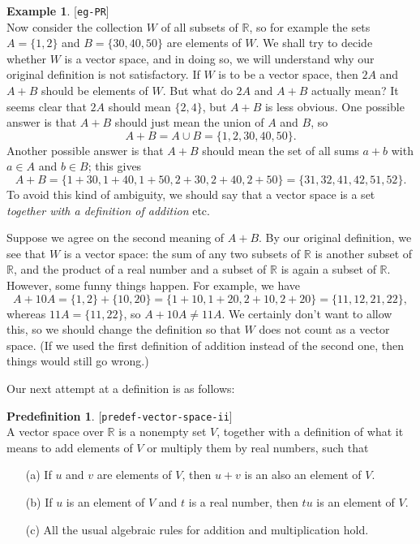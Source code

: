 \documentclass{amsart}
\newcommand{\lbl}[1]{\label{#1}\textup{[\texttt{#1}]}\ \\}
\newcommand{\lbl}{\label}
\newcommand{\R}         {{\mathbb{R}}}
\renewcommand{\:}       {\colon}
\theoremstyle{definition}
\newtheorem{predefinition}[theorem]{Predefinition}
\newtheorem{example}[theorem]{Example}
\begin{document}
\begin{example}\lbl{eg-PR}
 Now consider the collection $W$ of all subsets of $\R$, so
 for example the sets $A=\{1,2\}$ and $B=\{30,40,50\}$ are
 elements of $W$.  We shall try to decide whether $W$ is a
 vector space, and in doing so, we will understand why our
 original definition is not satisfactory.  If $W$ is to be a
 vector space, then $2A$ and $A+B$ should be elements of
 $W$.  But what do $2A$ and $A+B$ actually mean?  It seems
 clear that $2A$ should mean $\{2,4\}$, but $A+B$ is less
 obvious.  One possible answer is that $A+B$ should just
 mean the union of $A$ and $B$, so
 \[ A+B = A\cup B = \{1,2,30,40,50\}. \]
 Another possible answer is that $A+B$ should mean the set
 of all sums $a+b$ with $a\in A$ and $b\in B$; this gives
 \[ A+B = \{1+30,1+40,1+50,2+30,2+40,2+50\} =
          \{31,32,41,42,51,52\}.
 \]
 To avoid this kind of ambiguity, we should say that a
 vector space is a set \emph{together with a definition of
  addition} etc.

 Suppose we agree on the second meaning of $A+B$.  By our
 original definition, we see that $W$ is a vector space: the
 sum of any two subsets of $\R$ is another subset of $\R$,
 and the product of a real number and a subset of $\R$ is
 again a subset of $\R$.  However, some funny things happen.
 For example, we have
 \[ A+10 A = \{1,2\} + \{10,20\} =
      \{1+10,1+20,2+10,2+20\} = \{11,12,21,22\}, 
 \]
 whereas $11A=\{11,22\}$, so $A+10A\neq 11A$.  We certainly
 don't want to allow this, so we should change the
 definition so that $W$ does not count as a vector space.
 (If we used the first definition of addition instead of the
 second one, then things would still go wrong.)
\end{example}

Our next attempt at a definition is as follows:
\begin{predefinition}\lbl{predef-vector-space-ii}
 A vector space over $\R$ is a nonempty set $V$, together
 with a definition of what it means to add elements of $V$
 or multiply them by real numbers, such that
 \begin{itemize}
  \item[(a)] If $u$ and $v$ are elements of $V$, then $u+v$ is an
   also an element of $V$.
  \item[(b)] If $u$ is an element of $V$ and $t$ is a real number, then
   $tu$ is an element of $V$.
  \item[(c)] All the usual algebraic rules for addition and
   multiplication hold.
 \end{itemize}
\end{predefinition}
\end{document}
